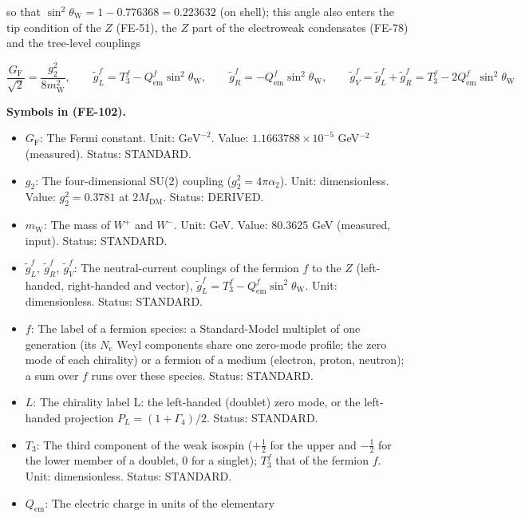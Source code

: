 \documentclass[
  10pt,
]{article}
\providecommand{\tightlist}{%
  \setlength{\itemsep}{0pt}\setlength{\parskip}{0pt}}
\begin{document}
so that \(\sin^2\theta_{\mathrm{W}} = 1 - 0.776368 = 0.223632\) (on
shell); this angle also enters the tip condition of the \(Z\) (FE-51),
the \(Z\) part of the electroweak condensates (FE-78) and the tree-level
couplings

\[
\frac{G_{\mathrm{F}}}{\sqrt2} = \frac{g_2^2}{8m_{\mathrm{W}}^2},\qquad
\tilde g^f_L = T_3^f - Q_{\mathrm{em}}^f\sin^2\theta_{\mathrm{W}},\qquad \tilde g^f_R =
 -Q_{\mathrm{em}}^f\sin^2\theta_{\mathrm{W}},\qquad
\tilde g^f_V = \tilde g^f_L + \tilde g^f_R = T_3^f - 2Q_{\mathrm{em}}^f\sin^2\theta_{\mathrm{W}} \tag{FE-102}
\]

\textbf{Symbols in (FE-102).}

\begin{itemize}
\tightlist
\item
  \(G_{\mathrm{F}}\): The Fermi constant. Unit: \(\mathrm{GeV}^{-2}\).
  Value: \(1.1663788\times10^{-5}\) GeV\(^{-2}\) (measured). Status:
  STANDARD.
\item
  \(g_2\): The four-dimensional SU(2) coupling
  (\(g_2^2 = 4\pi\alpha_2\)). Unit: dimensionless. Value:
  \(g_2^2 = 0.3781\) at \(2M_{\mathrm{DM}}\). Status: DERIVED.
\item
  \(m_{\mathrm{W}}\): The mass of \(W^+\) and \(W^-\). Unit: GeV. Value:
  80.3625 GeV (measured, input). Status: STANDARD.
\item
  \(\tilde g^f_L,\ \tilde g^f_R,\ \tilde g^f_V\): The neutral-current
  couplings of the fermion \(f\) to the \(Z\) (left-handed, right-handed
  and vector),
  \(\tilde g^f_L = T_3^f - Q^f_{\mathrm{em}}\sin^2\theta_{\mathrm{W}}\).
  Unit: dimensionless. Status: STANDARD.
\item
  \(f\): The label of a fermion species: a Standard-Model multiplet of
  one generation (its \(N_{\mathrm{c}}\) Weyl components share one
  zero-mode profile; the zero mode of each chirality) or a fermion of a
  medium (electron, proton, neutron); a sum over \(f\) runs over these
  species. Status: STANDARD.
\item
  \(L\): The chirality label L: the left-handed (doublet) zero mode, or
  the left-handed projection \(P_L = (1 + \Gamma_4)/2\). Status:
  STANDARD.
\item
  \(T_3\): The third component of the weak isospin (\(+\frac12\) for the
  upper and \(-\frac12\) for the lower member of a doublet, 0 for a
  singlet); \(T_3^f\) that of the fermion \(f\). Unit: dimensionless.
  Status: STANDARD.
\item
  \(Q_{\mathrm{em}}\): The electric charge in units of the elementary

\end{itemize}
\end{document}
